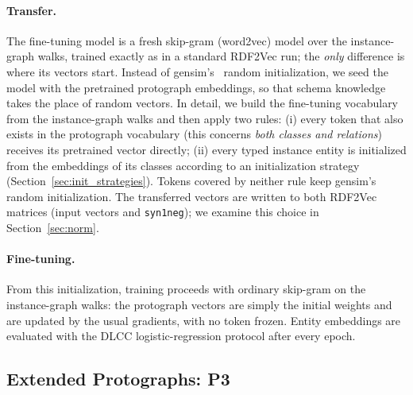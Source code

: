 \documentclass[a4paper,oneside,bibliography=totoc]{scrbook}
\begin{document}
\paragraph{Transfer.} The fine-tuning model is a fresh skip-gram (word2vec)
model over the instance-graph walks, trained exactly as in a standard RDF2Vec
run; the \emph{only} difference is where its vectors start. Instead of
gensim's~\cite{rehurek_software_2010} random initialization, we seed the model
with the pretrained protograph
embeddings, so that schema knowledge takes the place of random vectors. In
detail, we build the fine-tuning vocabulary from the instance-graph walks and
then apply two rules: (i) every token that also exists in the protograph vocabulary
(this concerns \emph{both classes and relations}) receives its pretrained
vector directly; (ii) every typed instance entity is
initialized from the embeddings of its classes according to an initialization
strategy (Section~\ref{sec:init_strategies}). Tokens covered by neither rule
keep gensim's random initialization. The transferred vectors are written to
both RDF2Vec matrices (input vectors and \texttt{syn1neg}); we examine this choice
in Section~\ref{sec:norm}.

\paragraph{Fine-tuning.} From this initialization, training proceeds with
ordinary skip-gram on the instance-graph walks: the protograph vectors are
simply the initial weights and are updated by the usual gradients, with no token
frozen. Entity embeddings are evaluated with the DLCC logistic-regression
protocol after every epoch.

\subsection{Extended Protographs: P3}
\label{sec:p3}
\end{document}

